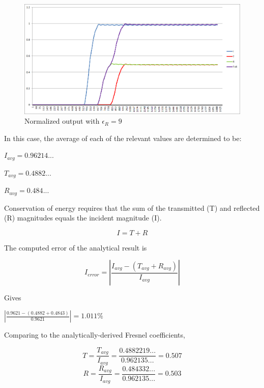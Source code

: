 \begin{figure}[H]
	\centering
	\includegraphics[width=\textwidth,
	keepaspectratio]{pw-epsilon-9-tir-power.png}
	\caption{Normalized output with $\epsilon_R = 9$}
	\label{fig:pwEpsilon9Normalized}
\end{figure}

In this case, the average of each of the relevant values are determined to be:

\begin{center}
$I_{avg} = 0.96214...$

$T_{avg} = 0.4882...$

$R_{avg} = 0.484...$
\end{center}

Conservation of energy requires that the sum of the transmitted (T) and reflected (R) magnitudes equals the incident magnitude (I).

\begin{equation}
I = T+R
\end{equation}

The computed error of the analytical result is

\begin{equation}
I_{error} = |\frac{I_{avg} - (T_{avg} + R_{avg})}{I_{avg}}|
\end{equation}

Gives

\begin{center}
	\begin{math}
	|\frac{0.9621-(0.4882 + 0.4843)}{0.9621}| = 1.011\%
	\end{math}
\end{center}

Comparing to the analytically-derived Fresnel coefficients,

\begin{equation}
T = \frac{T_{avg}}{I_{avg}} = \frac{0.4882219...}{0.962135...} = 0.507
\end{equation}
\begin{equation}
R = \frac{R_{avg}}{I_{avg}} = \frac{0.484332...}{0.962135...} = 0.503
\end{equation}

